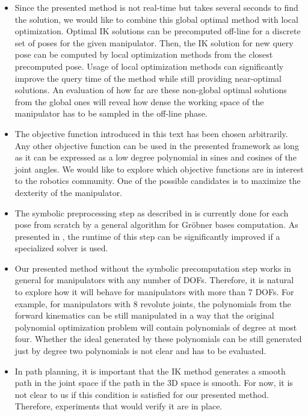 \begin{itemize}
  \item Since the presented method is not real-time but takes several seconds to find the solution, we would like to combine this global optimal method with local optimization.
  Optimal IK solutions can be precomputed off-line for a discrete set of poses for the given manipulator.
  Then, the IK solution for new query pose can be computed by local optimization methods from the closest precomputed pose.
  Usage of local optimization methods can significantly improve the query time of the method while still providing near-optimal solutions.
  An evaluation of how far are these non-global optimal solutions from the global ones will reveal how dense the working space of the manipulator has to be sampled in the off-line phase.

  \item The objective function  introduced in this text has been chosen arbitrarily.
  Any other objective function can be used in the presented framework as long as it can be expressed as a low degree polynomial in sines and cosines of the joint angles.
  We would like to explore which objective functions are in interest to the robotics community.
  One of the possible candidates is to maximize the dexterity of the manipulator.

  \item The symbolic preprocessing step as described in  is currently done for each pose from scratch by a general algorithm for Gr\"obner bases computation.
  As presented in , the runtime of this step can be significantly improved if a specialized solver is used.

  \item Our presented method without the symbolic precomputation step works in general for manipulators with any number of DOFs.
  Therefore, it is natural to explore how it will behave for manipulators with more than 7 DOFs.
  For example, for manipulators with 8 revolute joints, the polynomials from the forward kinematics can be still manipulated in a way that the original polynomial optimization problem will contain polynomials of degree at most four.
  Whether the ideal generated by these polynomials can be still generated just by degree two polynomials is not clear and has to be evaluated.

  \item In path planning, it is important that the IK method generates a smooth path in the joint space if the path in the 3D space is smooth.
  For now, it is not clear to us if this condition is satisfied for our presented method.
  Therefore, experiments that would verify it are in place. 
\end{itemize}

